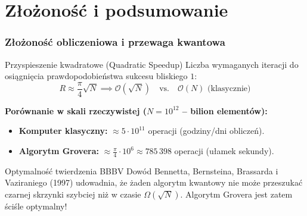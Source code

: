 \documentclass[aspectratio=169]{beamer}
\begin{document}
\section{Złożoność i podsumowanie}
\begin{frame}
    \frametitle{Złożoność obliczeniowa i przewaga kwantowa}

    \begin{exampleblock}{Przyspieszenie kwadratowe (Quadratic Speedup)}
        Liczba wymaganych iteracji do osiągnięcia prawdopodobieństwa sukcesu bliskiego $1$:
        \begin{equation*}
            R \approx \frac{\pi}{4}\sqrt{N} \implies \mathcal{O}(\sqrt{N}) \quad \text{vs.} \quad \mathcal{O}(N) \text{ (klasycznie)}
        \end{equation*}
    \end{exampleblock}

    \vspace{0.2cm}
    \textbf{Porównanie w skali rzeczywistej ($N = 10^{12}$ – bilion elementów):}
    \begin{itemize}
        \item \textbf{Komputer klasyczny:} $\approx 5 \cdot 10^{11}$ operacji (godziny/dni obliczeń).
        \item \textbf{Algorytm Grovera:} $\approx \frac{\pi}{4} \cdot 10^6 \approx 785\,398$ operacji (ułamek sekundy).
    \end{itemize}

    \begin{alertblock}{Optymalność twierdzenia BBBV}
        Dowód Bennetta, Bernsteina, Brassarda i Vaziraniego (1997) udowadnia, że żaden algorytm kwantowy nie może przeszukać czarnej skrzynki szybciej niż w czasie $\Omega(\sqrt{N})$. Algorytm Grovera jest zatem ściśle optymalny!
    \end{alertblock}
\end{frame}
\end{document}
